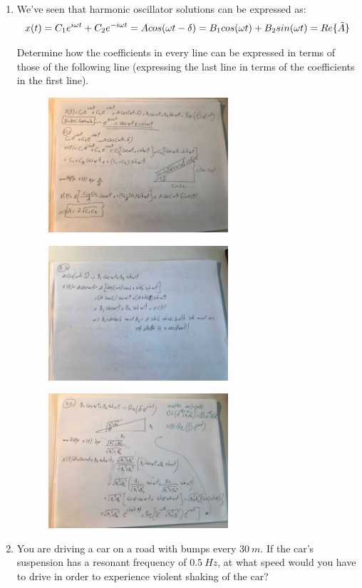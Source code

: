 \documentclass[fleqn]{article}
\begin{document}
\begin{enumerate}
    \pagebreak

    \item We’ve seen that harmonic oscillator solutions can be expressed as: 
    $$
    x(t)=C_1 e^{i\omega t}+C_2 e^{-i \omega t} \\
    =A cos(\omega t-\delta) \\
    =B_1 cos(\omega t)+B_2 sin(\omega t) \\
    =Re\{\tilde{A} \}
    $$

    Determine how the coefficients in every line can be expressed in terms
    of those of the following line (expressing the last line in terms of the
    coefficients in the first line).

    \includegraphics[height=5cm, width=9cm]{one.jpg} 

    \includegraphics[height=5cm, width=9cm]{two.jpg} 

    \includegraphics[height=5cm, width=9cm]{three.jpg} 


    \pagebreak
  
    \item You are driving a car on a road with bumps every $30 ~ m$. If the car’s
    suspension has a resonant frequency of $0.5 ~ Hz$, at what speed would
    you have to drive in order to experience violent shaking of the car?


\end{enumerate}
\end{document}
